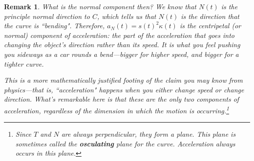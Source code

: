 \documentclass[12pt]{article}
\numberwithin{equation}{subsection}
\numberwithin{figure}{subsection}
\theoremstyle{note}
\newtheorem{remark}[subsection]{Remark}
\begin{document}
{\begin{remark}
	What is the \textit{normal component} then? We know that $N(t)$ is the principle normal direction to $C$, which tells us that $N(t)$ is the direction that the curve is ``bending". Therefore, $a_N(t)=s(t)^2\kappa(t)$ is the \textit{centripetal} (or normal) component of acceleration: the part of the acceleration that goes into changing the object's \textit{direction} rather than its speed. It is what you feel pushing you sideways as a car rounds a bend---bigger for higher speed, and bigger for a tighter curve. 
	
	This is a more mathematically justified footing of the claim you may know from physics---that is, ``acceleration" happens when you either change speed \textit{or} change direction. What's remarkable here is that these are the only two components of acceleration, regardless of the dimension in which the motion is occurring.\footnote{Since $T$ and $N$ are always perpendicular, they form a plane. This plane is sometimes called the \textbf{osculating} plane for the curve. Acceleration always occurs in this plane. }

\end{remark}




}
\end{document}
